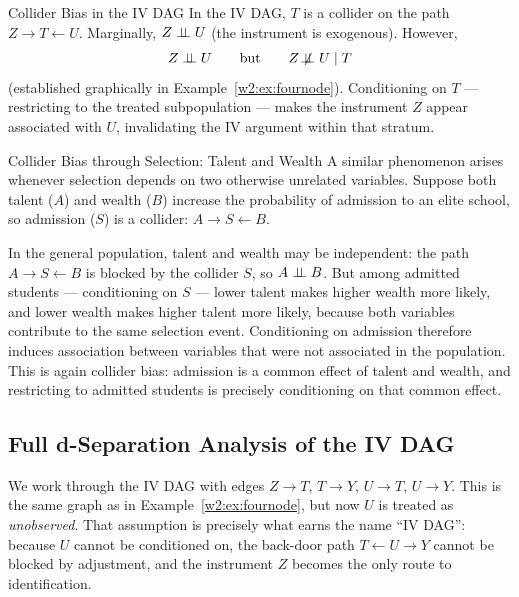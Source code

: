 \documentclass[master.tex]{subfiles}
\begin{document}
\begin{example}{Collider Bias in the IV DAG}
In the IV DAG, $T$ is a collider on the path $Z \to T \leftarrow U$.
Marginally, $Z \perp\!\!\!\perp U$ (the instrument is exogenous). However,
\[
  Z \perp\!\!\!\perp U \qquad \text{but} \qquad
  Z \not\!\perp\!\!\!\perp U \mid T
\]
(established graphically in Example~\ref{w2:ex:fournode}).
Conditioning on $T$ --- restricting to the treated subpopulation --- makes
the instrument $Z$ appear associated with $U$,
invalidating the IV argument within that stratum.
\end{example}

\begin{example}{Collider Bias through Selection: Talent and Wealth}
\label{w2:ex:admissions}
A similar phenomenon arises whenever selection depends on two otherwise
unrelated variables.
Suppose both talent ($A$) and wealth ($B$) increase the probability of
admission to an elite school, so admission ($S$) is a collider:
$A \to S \leftarrow B$.

\begin{center}
\end{center}

In the general population, talent and wealth may be independent: the
path $A \to S \leftarrow B$ is blocked by the collider $S$, so
$A \perp\!\!\!\perp B$.
But among admitted students --- conditioning on $S$ --- lower talent
makes higher wealth more likely, and lower wealth makes higher talent
more likely, because both variables contribute to the same selection
event.
Conditioning on admission therefore induces association between variables
that were not associated in the population.
This is again collider bias: admission is a common effect of talent and
wealth, and restricting to admitted students is precisely conditioning on
that common effect.
\end{example}

\subsection{Full d-Separation Analysis of the IV DAG}

We work through the IV DAG with edges $Z \to T$, $T \to Y$, $U \to T$,
$U \to Y$.  This is the same graph as in Example~\ref{w2:ex:fournode}, but now
$U$ is treated as \emph{unobserved}.  That assumption is precisely what earns
the name ``IV DAG'': because $U$ cannot be conditioned on, the back-door path
$T \leftarrow U \to Y$ cannot be blocked by adjustment, and the instrument
$Z$ becomes the only route to identification.
\end{document}
